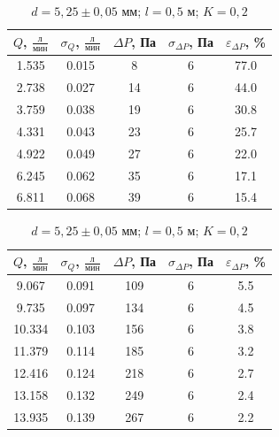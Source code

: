 \documentclass[a4paper,12pt]{article}
\begin{document}
\begin{table}[h!]
\centering
\begin{minipage}{0.48\textwidth}
\centering
    \begin{tabular}{|c|c|c|c|c|}
        \hline
        $Q$, $\frac{\text{л}}{\text{мин}}$ & $\sigma_Q$, $\frac{\text{л}}{\text{мин}}$  & $\Delta P$, Па & $\sigma_{\Delta P}$, Па & $\varepsilon_{\Delta P}$, \% \\
        \hline
        1.535 & 0.015 & 8 & 6 & 77.0 \\ \hline
        2.738 & 0.027 & 14 & 6 & 44.0 \\ \hline
        3.759 & 0.038 & 19 & 6 & 30.8 \\ \hline
        4.331 & 0.043 & 23 & 6 & 25.7 \\ \hline
        4.922 & 0.049 & 27 & 6 & 22.0 \\ \hline
        6.245 & 0.062 & 35 & 6 & 17.1 \\ \hline
        6.811 & 0.068 & 39 & 6 & 15.4 \\ \hline
    \end{tabular}
    \caption{$d=5,25 \pm 0,05$ мм; $l = 0,3$ м; $K = 0,2$}
\end{minipage}
\hfill
\begin{minipage}{0.48\textwidth}
\centering
    \begin{tabular}{|c|c|c|c|c|}
        \hline
        $Q$, $\frac{\text{л}}{\text{мин}}$ & $\sigma_Q$, $\frac{\text{л}}{\text{мин}}$  & $\Delta P$, Па & $\sigma_{\Delta P}$, Па & $\varepsilon_{\Delta P}$, \% \\
        \hline
        9.067 & 0.091 & 109 & 6 & 5.5 \\ \hline
        9.735 & 0.097 & 134 & 6 & 4.5 \\ \hline
        10.334 & 0.103 & 156 & 6 & 3.8 \\ \hline
        11.379 & 0.114 & 185 & 6 & 3.2 \\ \hline
        12.416 & 0.124 & 218 & 6 & 2.7 \\ \hline
        13.158 & 0.132 & 249 & 6 & 2.4 \\ \hline
        13.935 & 0.139 & 267 & 6 & 2.2 \\ \hline
    \end{tabular}
    \caption{$d = 5,25 \pm 0,05$ мм; $l = 0,5$ м; $K = 0,2$}
\end{minipage}
\end{table}
\end{document}

